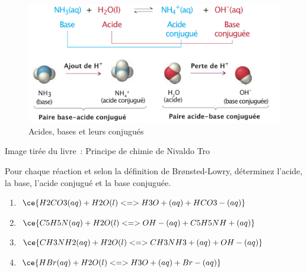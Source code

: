 \documentclass[
  11pt,
  a4paper,
  openany]{book}
\providecommand{\tightlist}{%
  \setlength{\itemsep}{0pt}\setlength{\parskip}{0pt}}
\newenvironment{credit}
  {\vspace{-1em}\begin{center}\begin{footnotesize}\begin{textit}}
  {\end{textit}\end{footnotesize}\end{center}}
\begin{document}

\begin{figure}

{\centering \includegraphics[width=0.9\linewidth]{images/acides-bases-1} 

}

\caption{Acides, bases et leurs conjugués}\label{fig:acides-bases-1}
\end{figure}

\begin{credit}
Image tirée du livre~: Principe de chimie de Nivaldo Tro

\end{credit}


\clearpage

\begin{Exercise}

Pour chaque réaction et selon la définition de Brønsted-Lowry, déterminez l'acide, la base, l'acide conjugué et la base conjuguée.

\begin{enumerate}
\def\labelenumi{\alph{enumi}.}
\tightlist
\item
  \(\ce{H2CO3(aq) + H2O(l) <=> H3O+(aq) + HCO3-(aq)}\)
\item
  \(\ce{C5H5N(aq) + H2O(l) <=> OH-(aq) + C5H5NH+(aq)}\)
\item
  \(\ce{CH3NH2(aq) + H2O(l) <=> CH3NH3+(aq) + OH-(aq)}\)
\item
  \(\ce{HBr(aq) + H2O(l) <=> H3O+(aq) + Br-(aq)}\)
\end{enumerate}

\end{Exercise}
\end{document}
